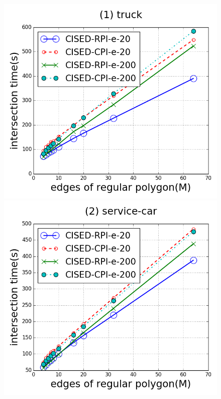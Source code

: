 \begin{figure}[tb!]
\centering
\includegraphics[scale = 0.250]{figures/Exp-M-poly-time-truck.png}
\includegraphics[scale = 0.250]{figures/Exp-M-poly-time-service.png}

\end{figure}
